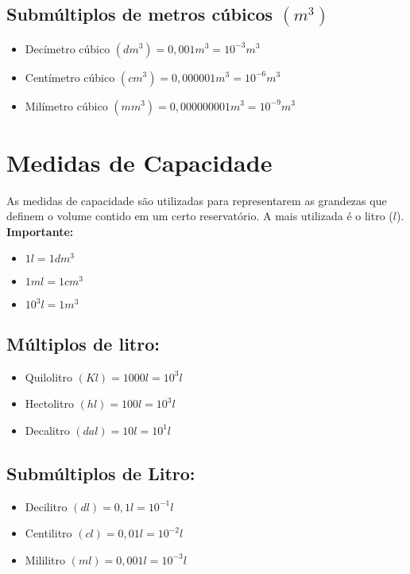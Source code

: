 	\subsection{Submúltiplos de metros cúbicos $(m^3)$}
		\begin{itemize}
		    \item Decímetro cúbico $(dm^3) = 0,001 m^3 = 10^{-3} m^3$
		    \item Centímetro cúbico $(cm^3) = 0,000001 m^3 = 10^{-6} m^3$
		    \item Milímetro cúbico $(mm^3) = 0,000000001 m^3 = 10^{-9} m^3$
		\end{itemize}
	
\section{Medidas de Capacidade}
As medidas de capacidade são utilizadas para representarem
as grandezas que definem o volume contido em um certo
reservatório. A mais utilizada é o litro ($l$).
	\\\textbf{Importante:}
	\begin{itemize}
	    \item $1l = 1dm^3$
	    \item $1 ml = 1 cm^3$
	    \item $10^3 l = 1 m^3$
	\end{itemize}

	\subsection{Múltiplos de litro:}
		\begin{itemize}
		    \item Quilolitro $(Kl) = 1000 l = 10^3 l$
		    \item Hectolitro $(hl) = 100 l = 10^3 l$
		    \item Decalitro $(dal) = 10 l = 10^1l$
		\end{itemize}
	
	\subsection{Submúltiplos de Litro:}
		\begin{itemize}
		    \item Decilitro $(dl) = 0,1 l = 10^{-1}l$
		    \item Centilitro $(cl) = 0,01 l = 10^{-2}l$
		    \item Mililitro $(ml) = 0,001 l = 10^{-3}l$
		\end{itemize}
	
